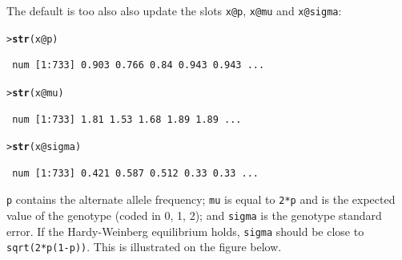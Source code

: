 \documentclass{article}\usepackage[]{graphicx}\usepackage[]{color}
\makeatletter
\newcommand{\hlopt}[1]{\textcolor[rgb]{0,0,0}{#1}}%
\newcommand{\hlstd}[1]{\textcolor[rgb]{0.345,0.345,0.345}{#1}}%
\newcommand{\hlkwc}[1]{\textcolor[rgb]{0.333,0.667,0.333}{#1}}%
\newcommand{\hlkwd}[1]{\textcolor[rgb]{0.737,0.353,0.396}{\textbf{#1}}}%
\newenvironment{kframe}{%
 \def\at@end@of@kframe{}%
 \ifinner\ifhmode%
  \def\at@end@of@kframe{\end{minipage}}%
  \begin{minipage}{\columnwidth}%
 \fi\fi%
 \def\FrameCommand##1{\hskip\@totalleftmargin \hskip-\fboxsep
 \colorbox{shadecolor}{##1}\hskip-\fboxsep
     \hskip-\linewidth \hskip-\@totalleftmargin \hskip\columnwidth}%
 \MakeFramed {\advance\hsize-\width
   \@totalleftmargin\z@ \linewidth\hsize
   \@setminipage}}%
 {\par\unskip\endMakeFramed%
 \at@end@of@kframe}
\newenvironment{knitrout}{}{} %
\makeatother
\begin{document}
  The default is too also also update the slots \verb!x@p!, \verb!x@mu! and \verb!x@sigma!:
\begin{knitrout}
\color{fgcolor}\begin{kframe}
\begin{alltt}
\hlstd{> }\hlkwd{str}\hlstd{(x}\hlopt{@}\hlkwc{p}\hlstd{)}
\end{alltt}
\begin{verbatim}
 num [1:733] 0.903 0.766 0.84 0.943 0.943 ...
\end{verbatim}
\begin{alltt}
\hlstd{> }\hlkwd{str}\hlstd{(x}\hlopt{@}\hlkwc{mu}\hlstd{)}
\end{alltt}
\begin{verbatim}
 num [1:733] 1.81 1.53 1.68 1.89 1.89 ...
\end{verbatim}
\begin{alltt}
\hlstd{> }\hlkwd{str}\hlstd{(x}\hlopt{@}\hlkwc{sigma}\hlstd{)}
\end{alltt}
\begin{verbatim}
 num [1:733] 0.421 0.587 0.512 0.33 0.33 ...
\end{verbatim}
\end{kframe}
\end{knitrout}
  \verb!p! contains the alternate allele frequency; \verb!mu! is equal to \verb!2*p!
  and is the expected value of the genotype (coded in 0, 1, 2); and \verb!sigma!
  is the genotype standard error. If the Hardy-Weinberg equilibrium holds, \verb!sigma!
  should be close to \verb!sqrt(2*p(1-p))!. This is illustrated on the figure below.
\end{document}
